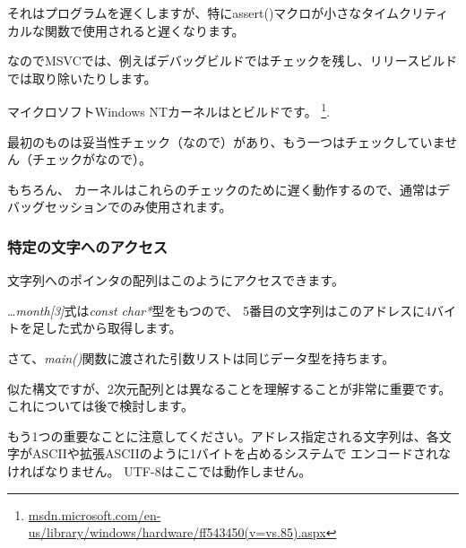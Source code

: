 それはプログラムを遅くしますが、特にassert()マクロが小さなタイムクリティカルな関数で使用されると遅くなります。

なのでMSVCでは、例えばデバッグビルドではチェックを残し、リリースビルドでは取り除いたりします。
 
マイクロソフト\gls{Windows NT}カーネルはとビルドです。
\footnote{\href{http://msdn.microsoft.com/en-us/library/windows/hardware/ff543450(v=vs.85).aspx}{msdn.microsoft.com/en-us/library/windows/hardware/ff543450(v=vs.85).aspx}}.

最初のものは妥当性チェック（なので）があり、もう一つはチェックしていません（チェックがなので）。

もちろん、 カーネルはこれらのチェックのために遅く動作するので、通常はデバッグセッションでのみ使用されます。


\subsubsection{特定の文字へのアクセス}

文字列へのポインタの配列はこのようにアクセスできます。



\dots \emph{month[3]}式は\emph{const char*}型をもつので、
5番目の文字列はこのアドレスに4バイトを足した式から取得します。

さて、\emph{main()}関数に渡された引数リストは同じデータ型を持ちます。



似た構文ですが、2次元配列とは異なることを理解することが非常に重要です。
これについては後で検討します。

もう1つの重要なことに注意してください。アドレス指定される文字列は、各文字が\ac{ASCII}や拡張\ac{ASCII}のように1バイトを占めるシステムで
エンコードされなければなりません。 
UTF-8はここでは動作しません。
